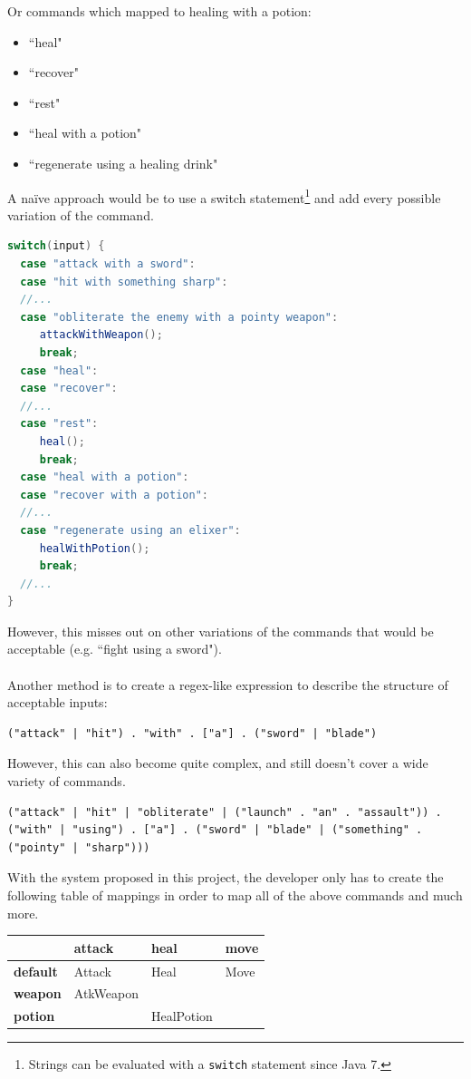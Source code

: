 \documentclass[11pt]{article}
\begin{document}
\begin{appendices}
Or commands which mapped to healing with a potion:

\begin{itemize}
\item ``heal"
\item ``recover"
\item ``rest"
\item ``heal with a potion"
\item ``regenerate using a healing drink"
\end{itemize}

A na\"ive approach would be to use a switch statement\footnote{Strings can be evaluated with a \texttt{switch} statement since Java 7.} and add every possible variation of the command.

\begin{lstlisting}[language=Java]
switch(input) {
  case "attack with a sword":
  case "hit with something sharp":
  //...
  case "obliterate the enemy with a pointy weapon":
     attackWithWeapon();
     break;
  case "heal":
  case "recover":
  //...
  case "rest":
     heal();
     break;
  case "heal with a potion":
  case "recover with a potion":
  //...
  case "regenerate using an elixer":
     healWithPotion();
     break;
  //...
}
\end{lstlisting}

However, this misses out on other variations of the commands that would be acceptable (e.g. ``fight using a sword").
\\
\\
Another method is to create a regex-like expression to describe the structure of acceptable inputs:

\begin{lstlisting}
("attack" | "hit") . "with" . ["a"] . ("sword" | "blade")
\end{lstlisting}

However, this can also become quite complex, and still doesn't cover a wide variety of commands.

\begin{lstlisting}
("attack" | "hit" | "obliterate" | ("launch" . "an" . "assault")) . ("with" | "using") . ["a"] . ("sword" | "blade" | ("something" . ("pointy" | "sharp")))
\end{lstlisting}

With the system proposed in this project, the developer only has to create the following table of mappings in order to map all of the above commands and much more.

\begin{table}[H]
\centering
\label{comparison-table}
\begin{tabular}{l|l|l|l}
                 & \textbf{attack} & \textbf{heal} & \textbf{move} \\ \hline
\textbf{default} & Attack          & Heal          & Move          \\ \hline
\textbf{weapon}  & AtkWeapon       &               &                 \\ \hline
\textbf{potion}  &                 & HealPotion    & \\
\end{tabular}
\end{table}


\end{appendices}
\end{document}
